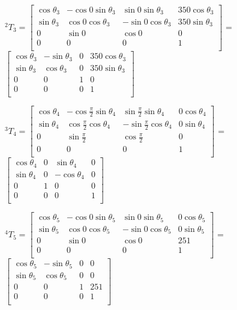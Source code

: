 \documentclass[12pt, a4paper]{article}
\begin{document}
\hspace*{-1cm} ${ }^{2} T_{3} =
\begin{bmatrix}
\cos \theta_3 & -\cos 0 \sin \theta_3 & \sin 0 \sin \theta_3 & 350 \cos \theta_3 \\
\sin \theta_3 & \cos 0 \cos \theta_3 & -\sin 0 \cos \theta_3 & 350 \sin \theta_3 \\
0 & \sin 0 & \cos 0 & 0 \\
0 & 0 & 0 & 1 \\
\end{bmatrix}$
= 
$\begin{bmatrix}
\cos \theta_3 & -\sin \theta_3 & 0 & 350 \cos \theta_3 \\
\sin \theta_3 & \cos \theta_3 & 0 & 350 \sin \theta_3 \\
0 & 0 & 1 & 0 \\
0 & 0 & 0 & 1 \\
\end{bmatrix}$

\hspace*{-1cm} ${ }^{3} T_{4} =
\begin{bmatrix}
\cos \theta_4 & -\cos \frac{\pi}{2} \sin \theta_4 & \sin \frac{\pi}{2} \sin \theta_4 & 0 \cos \theta_4 \\
\sin \theta_4 & \cos \frac{\pi}{2} \cos \theta_4 & -\sin \frac{\pi}{2} \cos \theta_4 & 0 \sin \theta_4 \\
0 & \sin \frac{\pi}{2} & \cos \frac{\pi}{2} & 0 \\
0 & 0 & 0 & 1 \\
\end{bmatrix}$
= 
$\begin{bmatrix}
\cos \theta_4 & 0 & \sin \theta_4 & 0 \\
\sin \theta_4 & 0 & - \cos \theta_4 & 0 \\
0 & 1 & 0 & 0 \\
0 & 0 & 0 & 1 \\
\end{bmatrix}$

\hspace*{-1cm} ${ }^{4} T_{5} =
\begin{bmatrix}
\cos \theta_5 & -\cos 0 \sin \theta_5 & \sin 0 \sin \theta_5 & 0 \cos \theta_5 \\
\sin \theta_5 & \cos 0 \cos \theta_5 & -\sin 0 \cos \theta_5 & 0 \sin \theta_5 \\
0 & \sin 0 & \cos 0 & 251 \\
0 & 0 & 0 & 1 \\
\end{bmatrix}$
= 
$\begin{bmatrix}
\cos \theta_5 & -\sin \theta_5 & 0 & 0 \\
\sin \theta_5 & \cos \theta_5 & 0 & 0 \\
0 & 0 & 1 & 251 \\
0 & 0 & 0 & 1 \\
\end{bmatrix}$
\end{document}
